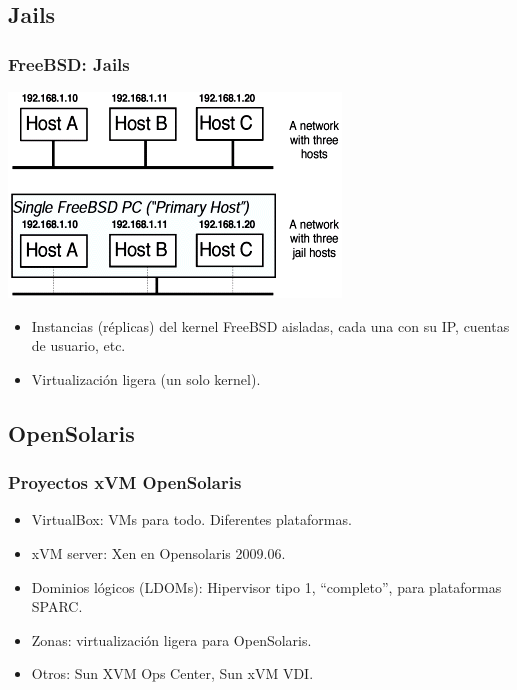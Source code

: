 \documentclass{beamer}
\begin{document}

\subsection{Jails}


\begin{frame}
\frametitle{FreeBSD: Jails}

\begin{center}
\includegraphics[scale=0.50,clip=false]{figs/armitage3.png}
\end{center}

\begin{itemize}
\item Instancias (réplicas) del kernel FreeBSD aisladas, cada una con su IP, cuentas de usuario, etc.
\item Virtualización ligera (un solo kernel).
\end{itemize}

\end{frame}




\subsection{OpenSolaris}

\begin{frame}
\frametitle{Proyectos xVM OpenSolaris}

\begin{itemize}
\item \alert{VirtualBox}: VMs para todo. Diferentes plataformas.
\item \alert{xVM server}: Xen en Opensolaris 2009.06.
\item Dominios lógicos (\alert{LDOMs}): Hipervisor tipo 1, ``completo'', para plataformas SPARC.
\item \alert{Zonas}: virtualización ligera para OpenSolaris.
\item Otros: Sun XVM Ops Center, Sun xVM VDI.
\end{itemize}

\end{frame}
\end{document}
